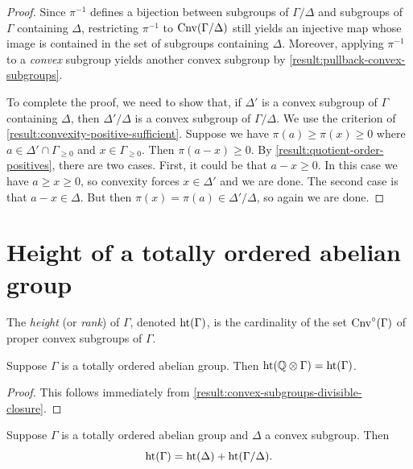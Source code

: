 \begin{proof}
Since $\pi^{-1}$ defines a bijection between subgroups of $\Gamma/\Delta$ and subgroups of $\Gamma$ containing $\Delta$, restricting $\pi^{-1}$ to $\operatorname{Cnv}(\Gamma/\Delta)$ still yields an injective map whose image is contained in the set of subgroups containing $\Delta$. Moreover, applying $\pi^{-1}$ to a \emph{convex} subgroup yields another convex subgroup by \cref{result:pullback-convex-subgroups}.
	
To complete the proof, we need to show that, if $\Delta'$ is a convex subgroup of $\Gamma$ containing $\Delta$, then $\Delta'/\Delta$ is a convex subgroup of $\Gamma/\Delta$. We use the criterion of \cref{result:convexity-positive-sufficient}. Suppose we have $\pi(a) \geq \pi(x) \geq 0$ where $a \in \Delta' \cap \Gamma_{\geq 0}$ and $x \in \Gamma_{\geq 0}$. Then $\pi(a-x) \geq 0$. By \cref{result:quotient-order-positives}, there are two cases. First, it could be that $a - x \geq 0$. In this case we have $a \geq x \geq 0$, so convexity forces $x \in \Delta'$ and we are done. The second case is that $a - x \in \Delta$. But then $\pi(x) = \pi(a) \in \Delta'/\Delta$, so again we are done. 
\end{proof}

\section{Height of a totally ordered abelian group}

\begin{definition}
	\label{definition:height}
	The \emph{height} (or \emph{rank}) of $\Gamma$, denoted $\operatorname{ht}(\Gamma)$, is the cardinality of the set $\operatorname{Cnv}^\circ(\Gamma)$ of proper convex subgroups of $\Gamma$.
\end{definition}

\begin{lemma}
Suppose $\Gamma$ is a totally ordered abelian group. Then $\operatorname{ht}(\mathbb{Q} \otimes \Gamma) = \operatorname{ht}(\Gamma)$. 
\end{lemma}

\begin{proof}
This follows immediately from \cref{result:convex-subgroups-divisible-closure}. 
\end{proof}

\begin{lemma}
	Suppose $\Gamma$ is a totally ordered abelian group and $\Delta$ a convex subgroup. Then
	\[ \operatorname{ht}(\Gamma) = \operatorname{ht}(\Delta) + \operatorname{ht}(\Gamma/\Delta). \]
\end{lemma}

